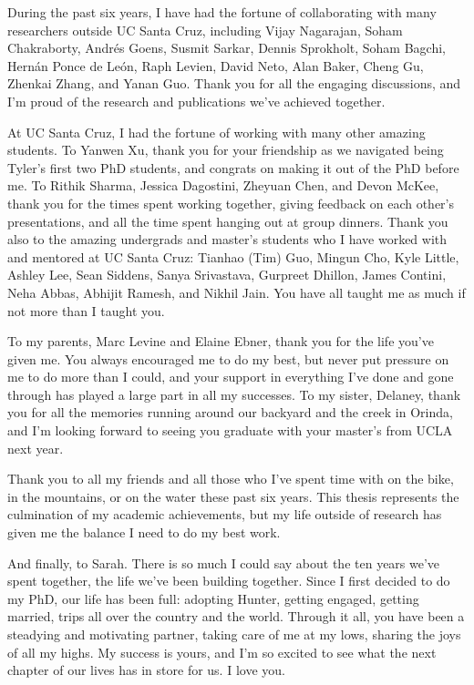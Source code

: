 During the past six years, I have had the fortune of collaborating with many researchers outside UC Santa Cruz, including Vijay Nagarajan, Soham Chakraborty, Andr\'es Goens, Susmit Sarkar, Dennis Sprokholt, Soham Bagchi, Hern\'an Ponce de Le\'on, Raph Levien, David Neto, Alan Baker, Cheng Gu, Zhenkai Zhang, and Yanan Guo. Thank you for all the engaging discussions, and I'm proud of the research and publications we've achieved together.

At UC Santa Cruz, I had the fortune of working with many other amazing students. To Yanwen Xu, thank you for your friendship as we navigated being Tyler's first two PhD students, and congrats on making it out of the PhD before me. To Rithik Sharma, Jessica Dagostini, Zheyuan Chen, and Devon McKee, thank you for the times spent working together, giving feedback on each other's presentations, and all the time spent hanging out at group dinners. Thank you also to the amazing undergrads and master's students who I have worked with and mentored at UC Santa Cruz: Tianhao (Tim) Guo, Mingun Cho, Kyle Little, Ashley Lee, Sean Siddens, Sanya Srivastava, Gurpreet Dhillon, James Contini, Neha Abbas, Abhijit Ramesh, and Nikhil Jain. You have all taught me as much if not more than I taught you.

To my parents, Marc Levine and Elaine Ebner, thank you for the life you've given me. You always encouraged me to do my best, but never put pressure on me to do more than I could, and your support in everything I've done and gone through has played a large part in all my successes. To my sister, Delaney, thank you for all the memories running around our backyard and the creek in Orinda, and I'm looking forward to seeing you graduate with your master's from UCLA next year.

Thank you to all my friends and all those who I've spent time with on the bike, in the mountains, or on the water these past six years. This thesis represents the culmination of my academic achievements, but my life outside of research has given me the balance I need to do my best work.

And finally, to Sarah. There is so much I could say about the ten years we've spent together, the life we've been building together. Since I first decided to do my PhD, our life has been full: adopting Hunter, getting engaged, getting married, trips all over the country and the world. Through it all, you have been a steadying and motivating partner, taking care of me at my lows, sharing the joys of all my highs. My success is yours, and I'm so excited to see what the next chapter of our lives has in store for us. I love you.
